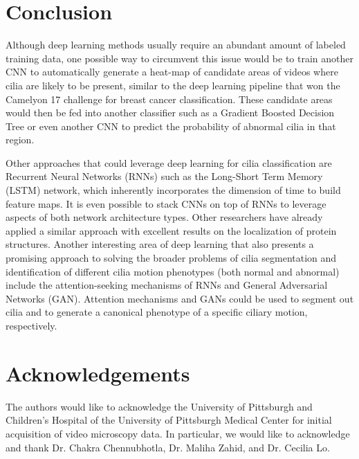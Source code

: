 \section{Conclusion}

Although deep learning methods usually require an abundant amount of labeled training data, one possible way to circumvent this issue would be to train another CNN to automatically generate a heat-map of candidate areas of videos where cilia are likely to be present, similar to the deep learning pipeline \cite{wang2016deep} that won the Camelyon 17 challenge for breast cancer classification. These candidate areas would then be fed into another classifier such as a Gradient Boosted Decision Tree or even another CNN to predict the probability of abnormal cilia in that region.
 
Other approaches that could leverage deep learning for cilia classification are Recurrent Neural Networks (RNNs) such as the Long-Short Term Memory (LSTM) network, which inherently incorporates the dimension of time to build feature maps. It is even possible to stack CNNs on top of RNNs to leverage aspects of both network architecture types. Other researchers \cite{sonderby2015convolutional} have already applied a similar approach with excellent results on the localization of protein structures. Another interesting area of deep learning that also presents a promising approach to solving the broader problems of cilia segmentation and identification of different cilia motion phenotypes (both normal and abnormal) include the attention-seeking mechanisms of RNNs and General Adversarial Networks (GAN). Attention mechanisms and GANs could be used to segment out cilia and to generate a canonical phenotype of a specific ciliary motion, respectively.

\section{Acknowledgements}

The authors would like to acknowledge the University of Pittsburgh and Children's Hospital of the University of Pittsburgh Medical Center for initial acquisition of video microscopy data. In particular, we would like to acknowledge and thank Dr. Chakra Chennubhotla, Dr. Maliha Zahid, and Dr. Cecilia Lo.


